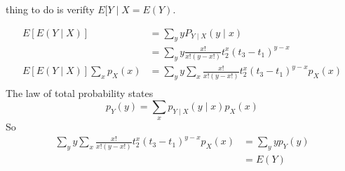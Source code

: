 \documentclass{tufte-book}
\theoremstyle{mytheoremstyle}
\theoremstyle{mylemstyle}
\theoremstyle{mydefstyle}
\begin{document}
\begin{enumerate}
 thing to do is verifty $E[Y\mid X = E(Y)$.

\begin{align*}
E[E(Y\mid X)]&= \sum_y yP_{Y\mid X}(y\mid x)\\
&= \sum_y y \frac{x!}{x!(y-x!)}t_2^x(t_3-t_1)^{y-x}\\
E[E(Y\mid X)] \sum_xp_X(x) &= \sum_y y \sum_x \frac{x!}{x!(y-x!)}t_2^x(t_3-t_1)^{y-x}p_X(x)\\
\end{align*}
The law of total probability states
\[ p_Y(y) = \sum_xp_{Y\mid X}(y \mid x) p_{X}(x) \]
So
\begin{align*}
\sum_y y \sum_x \frac{x!}{x!(y-x!)}t_2^x(t_3-t_1)^{y-x}p_X(x)&=\sum_y yp_Y(y)\\
&= E(Y)\\
\end{align*}
\end{enumerate}
\end{document}
